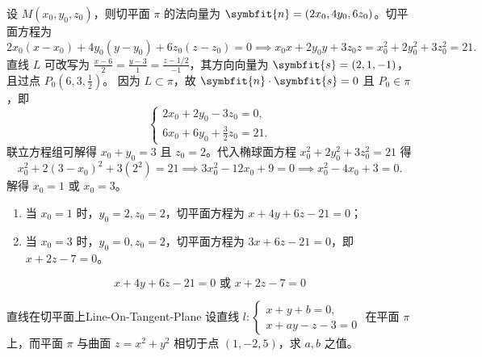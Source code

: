 \begin{solution}
    设 $M(x_0, y_0, z_0)$，则切平面 $\pi$ 的法向量为 $\symbfit{n} = (2x_0, 4y_0, 6z_0)$。切平面方程为
    \begin{equation}
        2x_0(x - x_0) + 4y_0(y - y_0) + 6z_0(z - z_0) = 0 \implies x_0x + 2y_0y + 3z_0z = x_0^2 + 2y_0^2 + 3z_0^2 = 21.
    \end{equation}
    直线 $L$ 可改写为 $\frac{x - 6}{2} = \frac{y - 3}{1} = \frac{z - 1/2}{-1}$，其方向向量为 $\symbfit{s} = (2, 1, -1)$，且过点 $P_0(6, 3, \frac{1}{2})$。
    因为 $L \subset \pi$，故 $\symbfit{n} \cdot \symbfit{s} = 0$ 且 $P_0 \in \pi$，即
    \begin{equation}
        \begin{cases}
            2x_0 + 2y_0 - 3z_0 = 0, \\
            6x_0 + 6y_0 + \frac{3}{2}z_0 = 21.
        \end{cases}
    \end{equation}
    联立方程组可解得 $x_0 + y_0 = 3$ 且 $z_0 = 2$。代入椭球面方程 $x_0^2 + 2y_0^2 + 3z_0^2 = 21$ 得
    \begin{equation}
        x_0^2 + 2(3 - x_0)^2 + 3(2^2) = 21 \implies 3x_0^2 - 12x_0 + 9 = 0 \implies x_0^2 - 4x_0 + 3 = 0.
    \end{equation}
    解得 $x_0 = 1$ 或 $x_0 = 3$。
    \begin{enumerate}
        \item 当 $x_0 = 1$ 时，$y_0 = 2, z_0 = 2$，切平面方程为 $x + 4y + 6z - 21 = 0$；
        \item 当 $x_0 = 3$ 时，$y_0 = 0, z_0 = 2$，切平面方程为 $3x + 6z - 21 = 0$，即 $x + 2z - 7 = 0$。
    \end{enumerate}
    \begin{equation}
        \boxed{x + 4y + 6z - 21 = 0 \text{ 或 } x + 2z - 7 = 0}
    \end{equation}
\end{solution}


\begin{problem}{直线在切平面上}{Line-On-Tangent-Plane}
    设直线 $l: \begin{cases} x + y + b = 0, \\ x + ay - z - 3 = 0 \end{cases}$ 在平面 $\pi$ 上，而平面 $\pi$ 与曲面 $z = x^2 + y^2$ 相切于点 $(1, -2, 5)$，求 $a, b$ 之值。
\end{problem}

